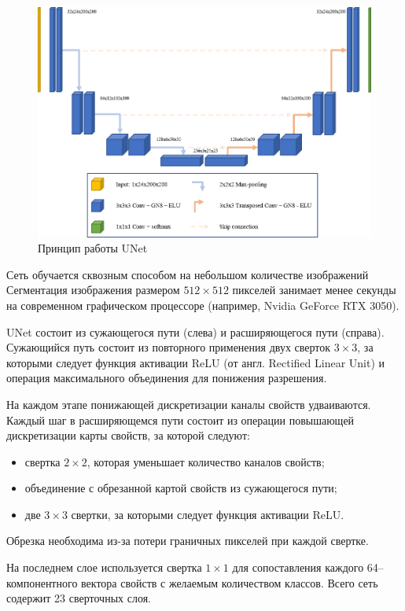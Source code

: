 \begin{figure}[H]
	\centering
	\includegraphics[width=\textwidth]{img/unet.png}
	\caption{Принцип работы UNet}
	\label{fig:unet}
\end{figure}

Сеть обучается сквозным способом на небольшом количестве изображений Сегментация изображения размером $512 \times 512$ пикселей занимает менее секунды на современном графическом процессоре (например, Nvidia GeForce RTX 3050).

UNet состоит из сужающегося пути (слева) и расширяющегося пути (справа). Сужающийся путь состоит из повторного применения двух сверток $3 \times 3$, за которыми следует функция активации ReLU (от англ. Rectified Linear Unit) и операция максимального объединения для понижения разрешения.

На каждом этапе понижающей дискретизации каналы свойств удваиваются. Каждый шаг в расширяющемся пути состоит из операции повышающей дискретизации карты свойств, за которой следуют:
\begin{itemize}
	\item свертка $2 \times 2$, которая уменьшает количество каналов свойств;
	\item объединение с обрезанной картой свойств из сужающегося пути;
	\item две $3 \times 3$ свертки, за которыми следует функция активации ReLU.
\end{itemize}

Обрезка необходима из-за потери граничных пикселей при каждой свертке.

На последнем слое используется свертка $1 \times 1$ для сопоставления каждого 64--компонентного вектора свойств с желаемым количеством классов. Всего сеть содержит 23 сверточных слоя.

